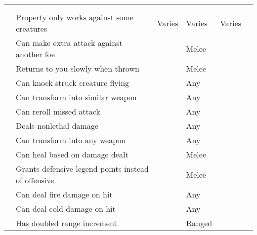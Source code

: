        \onecolumn
        \begin{longtabuwrapper}
            \begin{longtabu}{l X l l l l}
                \\
                 &  &  &  &  &  \\
                 & Property only works against some creatures & Varies & Varies & Varies &  \\
                 & Can make extra attack against another foe &  & Melee &  \\
                 & Returns to you slowly when thrown &  & Melee &  \\
                 & Can knock struck creature flying &  & Any &  \\
                 & Can transform into similar weapon &  & Any &  \\
                 & Can reroll missed attack &  & Any &  \\
                 & Deals nonlethal damage &  & Any &  \\
                 & Can transform into any weapon &  & Any &  \\
                 & Can heal based on damage dealt &  & Melee &  \\
                 & Grants defensive legend points instead of offensive &  & Melee &  \\
                 & Can deal fire damage on hit &  & Any &  \\
                 & Can deal cold damage on hit &  & Any &  \\
                 & Has doubled range increment &  & Ranged &  \\

\end{longtabu}
\end{longtabuwrapper}
